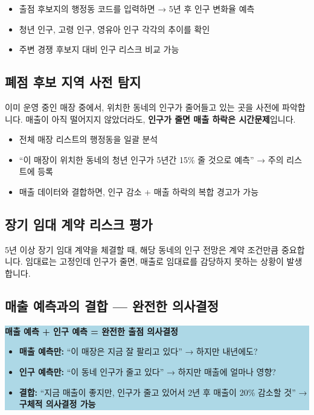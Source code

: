 \documentclass[11pt, a4paper]{article}
\begin{document}
\begin{itemize}[itemsep=3pt, leftmargin=2em]
  \item 출점 후보지의 행정동 코드를 입력하면 → 5년 후 인구 변화율 예측
  \item 청년 인구, 고령 인구, 영유아 인구 각각의 추이를 확인
  \item 주변 경쟁 후보지 대비 인구 리스크 비교 가능
\end{itemize}

\subsection{폐점 후보 지역 사전 탐지}

이미 운영 중인 매장 중에서, 위치한 동네의 인구가 줄어들고 있는 곳을 사전에 파악합니다. 매출이 아직 떨어지지 않았더라도, \textbf{인구가 줄면 매출 하락은 시간문제}입니다.

\begin{itemize}[itemsep=3pt, leftmargin=2em]
  \item 전체 매장 리스트의 행정동을 일괄 분석
  \item ``이 매장이 위치한 동네의 청년 인구가 5년간 15\% 줄 것으로 예측'' → 주의 리스트에 등록
  \item 매출 데이터와 결합하면, 인구 감소 + 매출 하락의 복합 경고가 가능
\end{itemize}

\subsection{장기 임대 계약 리스크 평가}

5년 이상 장기 임대 계약을 체결할 때, 해당 동네의 인구 전망은 계약 조건만큼 중요합니다. 임대료는 고정인데 인구가 줄면, 매출로 임대료를 감당하지 못하는 상황이 발생합니다.

\subsection{매출 예측과의 결합 — 완전한 의사결정}

\colorbox{lightblue}{%
\begin{minipage}{0.95\textwidth}\vspace{8pt}
\centering
{\large\bfseries\color{darkblue} 매출 예측 + 인구 예측 = 완전한 출점 의사결정}\\[8pt]
\begin{minipage}{0.9\textwidth}
\begin{itemize}[itemsep=4pt, leftmargin=1.5em]
  \item \textbf{매출 예측만:} ``이 매장은 지금 잘 팔리고 있다'' → 하지만 내년에도?
  \item \textbf{인구 예측만:} ``이 동네 인구가 줄고 있다'' → 하지만 매출에 얼마나 영향?
  \item \textbf{결합:} ``지금 매출이 좋지만, 인구가 줄고 있어서 2년 후 매출이 20\% 감소할 것'' → \textbf{구체적 의사결정 가능}
\end{itemize}
\end{minipage}
\vspace{8pt}
\end{minipage}%
}
\end{document}
